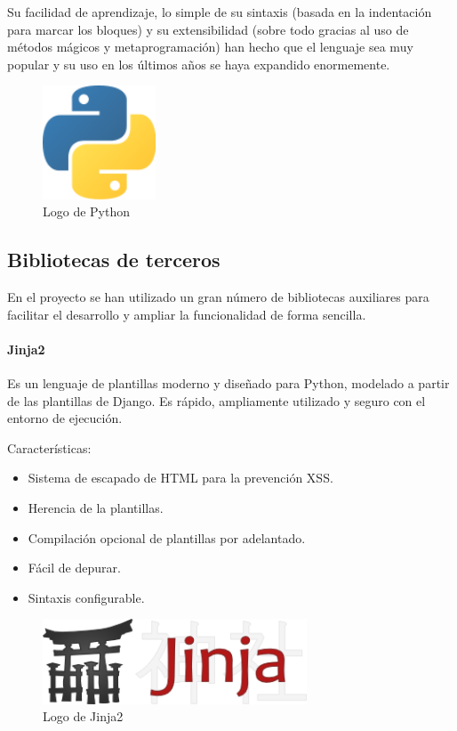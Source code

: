 Su facilidad de aprendizaje, lo simple de su sintaxis (basada en la indentación
para marcar los bloques) y su extensibilidad (sobre todo gracias al uso de métodos
mágicos y metaprogramación) han hecho que el lenguaje sea muy popular y su uso
en los últimos años se haya expandido enormemente.

\begin{figure}[htbp]
    \centering
    \includegraphics[width=0.3\textwidth]{6_implementacion/python_logo}
    \caption{Logo de Python}
    \label{fig:python-logo}
\end{figure}

\subsection{Bibliotecas de terceros}

En el proyecto se han utilizado un gran número de bibliotecas auxiliares para
facilitar el desarrollo y ampliar la funcionalidad de forma sencilla.

\paragraph{Jinja2~\cite{jinja}}
Es un lenguaje de plantillas moderno y diseñado para Python, modelado a partir de las plantillas de Django.
Es rápido, ampliamente utilizado y seguro con el entorno de ejecución.

Características:

\begin{itemize}
    \item Sistema de escapado de HTML para la prevención XSS.
    \item Herencia de la plantillas.
    \item Compilación opcional de plantillas por adelantado.
    \item Fácil de depurar.
    \item Sintaxis configurable.
\end{itemize}

\begin{figure}[htbp]
    \centering
    \includegraphics[width=0.7\textwidth]{6_implementacion/jinja_logo}
    \caption{Logo de Jinja2}
    \label{fig:jinja-logo}
\end{figure}

